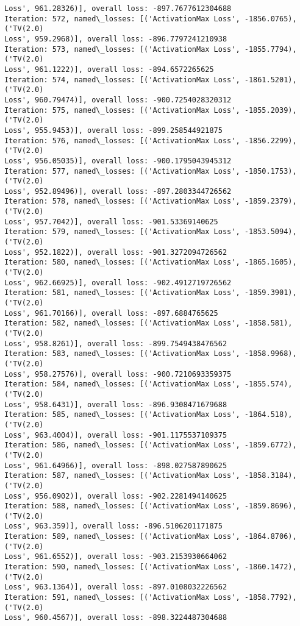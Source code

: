 \documentclass[10pt]{article}
\begin{document}
\begin{Verbatim}[commandchars=\\\{\}]
Loss', 961.28326)], overall loss: -897.7677612304688
Iteration: 572, named\_losses: [('ActivationMax Loss', -1856.0765), ('TV(2.0)
Loss', 959.2968)], overall loss: -896.7797241210938
Iteration: 573, named\_losses: [('ActivationMax Loss', -1855.7794), ('TV(2.0)
Loss', 961.1222)], overall loss: -894.6572265625
Iteration: 574, named\_losses: [('ActivationMax Loss', -1861.5201), ('TV(2.0)
Loss', 960.79474)], overall loss: -900.7254028320312
Iteration: 575, named\_losses: [('ActivationMax Loss', -1855.2039), ('TV(2.0)
Loss', 955.9453)], overall loss: -899.258544921875
Iteration: 576, named\_losses: [('ActivationMax Loss', -1856.2299), ('TV(2.0)
Loss', 956.05035)], overall loss: -900.1795043945312
Iteration: 577, named\_losses: [('ActivationMax Loss', -1850.1753), ('TV(2.0)
Loss', 952.89496)], overall loss: -897.2803344726562
Iteration: 578, named\_losses: [('ActivationMax Loss', -1859.2379), ('TV(2.0)
Loss', 957.7042)], overall loss: -901.53369140625
Iteration: 579, named\_losses: [('ActivationMax Loss', -1853.5094), ('TV(2.0)
Loss', 952.1822)], overall loss: -901.3272094726562
Iteration: 580, named\_losses: [('ActivationMax Loss', -1865.1605), ('TV(2.0)
Loss', 962.66925)], overall loss: -902.4912719726562
Iteration: 581, named\_losses: [('ActivationMax Loss', -1859.3901), ('TV(2.0)
Loss', 961.70166)], overall loss: -897.6884765625
Iteration: 582, named\_losses: [('ActivationMax Loss', -1858.581), ('TV(2.0)
Loss', 958.8261)], overall loss: -899.7549438476562
Iteration: 583, named\_losses: [('ActivationMax Loss', -1858.9968), ('TV(2.0)
Loss', 958.27576)], overall loss: -900.7210693359375
Iteration: 584, named\_losses: [('ActivationMax Loss', -1855.574), ('TV(2.0)
Loss', 958.6431)], overall loss: -896.9308471679688
Iteration: 585, named\_losses: [('ActivationMax Loss', -1864.518), ('TV(2.0)
Loss', 963.4004)], overall loss: -901.1175537109375
Iteration: 586, named\_losses: [('ActivationMax Loss', -1859.6772), ('TV(2.0)
Loss', 961.64966)], overall loss: -898.027587890625
Iteration: 587, named\_losses: [('ActivationMax Loss', -1858.3184), ('TV(2.0)
Loss', 956.0902)], overall loss: -902.2281494140625
Iteration: 588, named\_losses: [('ActivationMax Loss', -1859.8696), ('TV(2.0)
Loss', 963.359)], overall loss: -896.5106201171875
Iteration: 589, named\_losses: [('ActivationMax Loss', -1864.8706), ('TV(2.0)
Loss', 961.6552)], overall loss: -903.2153930664062
Iteration: 590, named\_losses: [('ActivationMax Loss', -1860.1472), ('TV(2.0)
Loss', 963.1364)], overall loss: -897.0108032226562
Iteration: 591, named\_losses: [('ActivationMax Loss', -1858.7792), ('TV(2.0)
Loss', 960.4567)], overall loss: -898.3224487304688

\end{Verbatim}
\end{document}
